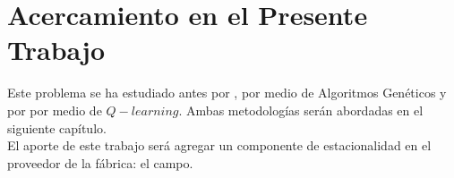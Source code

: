 \section{Acercamiento en el Presente Trabajo}

Este problema se ha estudiado antes por \citet{Strozzi}, por medio de Algoritmos Genéticos y por \citet{Chaharsooghi} por medio de $Q-learning$. Ambas metodolog\'ias ser\'an abordadas en el siguiente cap\'itulo.\\

El aporte de este trabajo será agregar un componente de estacionalidad en el proveedor de la f\'abrica: el campo.